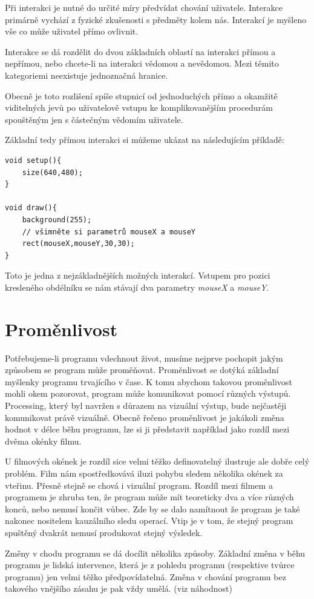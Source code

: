 \documentclass[11pt]{book}
\newcommand{\oddil}[1]{\section{#1}\label{sec:#1}}
\newcommand{\vyraz}[1]{\textit{\gls{#1}}\index{#1}}
\begin{document}
Při interakci je nutné do určité míry předvídat chování uživatele. Interakce primárně vychází z fyzické zkušenosti s předměty kolem nás. Interakcí je myšleno vše co může uživatel přímo ovlivnit.

Interakce se dá rozdělit do dvou základních oblastí na interakci přímou a nepřímou, nebo chcete-li na interakci vědomou a nevědomou. Mezi těmito kategoriemi neexistuje jednoznačná hranice.

Obecně je toto rozlišení spíše stupnicí od jednoduchých přímo a okamžitě viditelných jevů po uživatelově vstupu ke komplikovanějším procedurám spouštěným jen s částečným vědomím uživatele.

Základní tedy přímou interakci si můžeme ukázat na následujícím příkladě:

\begin{lstlisting}
void setup(){
	size(640,480);
}

void draw(){
	background(255);
	// všimněte si parametrů mouseX a mouseY
	rect(mouseX,mouseY,30,30);
}
\end{lstlisting}

Toto je jedna z nejzákladnějších možných interakcí. Vstupem pro pozici kresleného obdélníku se nám stávají dva parametry \vyraz{mouseX} a \vyraz{mouseY}.


\oddil{Proměnlivost}


Potřebujeme-li programu vdechnout život, musíme nejprve pochopit jakým způsobem se program může proměňovat. Proměnlivost se dotýká základní myšlenky programu trvajícího v čase. K tomu abychom takovou proměnlivost mohli okem pozorovat, program může komunikovat pomocí různých výstupů. Processing, který byl navržen s důrazem na vizuální výstup, bude nejčastěji komunikovat právě vizuálně. Obecně řečeno proměnlivost je jakákoli změna hodnot v délce běhu programu, lze si ji představit například jako rozdíl mezi dvěma okénky filmu.

U filmových okének je rozdíl sice velmi těžko definovatelný ilustruje ale dobře celý problém. Film nám spostředkovává iluzi pohybu sledem několika okének za vteřinu. Přesně stejně se chová i vizuální program. Rozdíl mezi filmem a programem je zhruba ten, že program může mít teoreticky dva a více různých konců, nebo nemusí končit vůbec. Zde by se dalo namítnout že program je také nakonec nositelem kauzálního sledu operací. Vtip je v tom, že stejný program spuštěný dvakrát nemusí produkovat stejný výsledek.

Změny v chodu programu se dá docílit několika způsoby. Základní změna v běhu programu je lidská intervence, která je z pohledu programu (respektive tvůrce programu) jen velmi těžko předpovídatelná. Změna v chování programu bez takového vnějšího zásahu je pak vždy umělá. (viz náhodnost)
\end{document}
